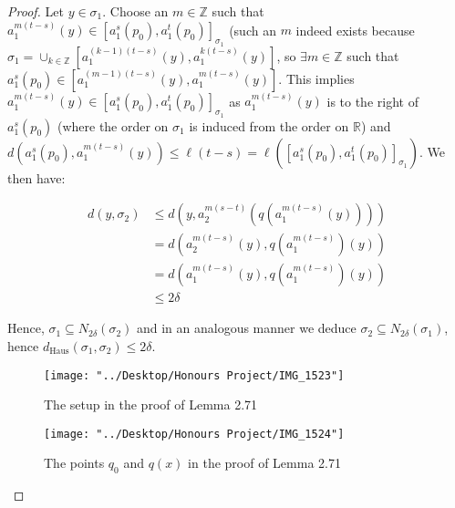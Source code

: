 \documentclass[12pt]{article}
\newcommand{\vs}{\vskip10pt}
\begin{document}
\begin{proof}
		\vs 
		
		Let $y \in \sigma_1$.  Choose an $m \in \mathbb{Z}$ such that $a_1^{m(t-s)} (y) \in [a_1^s (p_0), a_1^t (p_0)]_{\sigma_1}$ (such an $m$ indeed exists because $\sigma_1 = \cup_{k \in \mathbb{Z}} [a_1^{(k-1)(t-s)}(y), a_1^{k(t-s)}(y)]$, so $\exists m \in \mathbb{Z}$ such that $a_1^s(p_0) \in [a_1^{(m-1)(t-s)}(y), a_1^{m(t-s)}(y)]$. This implies $a_1^{m(t-s)}(y) \in [a_1^s(p_0), a_1^t (p_0)]_{\sigma_1}$ as $a_1^{m(t-s)}(y)$ is to the right of $a_1^s(p_0)$ (where the order on $\sigma_1$ is induced from the order on $\mathbb{R}$) and $d(a_1^s (p_0), a_1^{m(t-s)}(y)) \leq \ell (t - s) = \ell([a_1^s(p_0), a_1^t (p_0)]_{\sigma_1})$. We then have: 
		
		\begin{align*}
		d(y, \sigma_2) &\leq d(y, a_2^{m(s-t)}(q(a_1^{m(t-s)}(y)))) \\
		&= d(a_2^{m(t-s)}(y), q(a_1^{m(t-s)})(y)) \\
		&= d(a_1^{m(t-s)}(y), q(a_1^{m(t-s)})(y)) \\
		&\leq 2 \delta 
		\end{align*}
		
		
		Hence, $\sigma_1 \subseteq N_{2 \delta} (\sigma_2)$ and in an analogous manner we deduce $\sigma_2 \subseteq N_{2 \delta}(\sigma_1)$, hence $d_{\text{Haus}}(\sigma_1, \sigma_2) \leq 2 \delta$. 
		
		
		
\begin{figure} [H]
	\centering
	\texttt{[image: "../Desktop/Honours Project/IMG\_1523"]}
	\caption{The setup in the proof of Lemma 2.71}
	\label{fig:img1523}
\end{figure}

\begin{figure} [H]
	\centering
	\texttt{[image: "../Desktop/Honours Project/IMG\_1524"]}
	\caption{The points $q_0$ and $q(x)$ in the proof of Lemma 2.71}
	\label{fig:img1524}
\end{figure}
		
	\end{proof}
\end{document}
